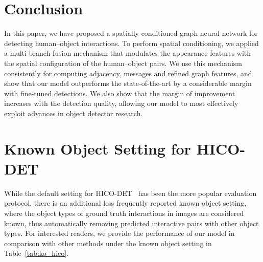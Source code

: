 \documentclass[10pt,twocolumn,letterpaper]{article}
\begin{document}
\section{Conclusion}

In this paper, we have proposed a spatially conditioned graph neural network for detecting human--object interactions. To perform spatial conditioning, we applied a multi-branch fusion mechanism that modulates the appearance features with the spatial configuration of the human--object pairs. We use this mechanism consistently for computing adjacency, messages and refined graph features, and show that our model outperforms the state-of-the-art by a considerable margin with fine-tuned detections.
We also show that the margin of improvement increases with the detection quality, allowing our model to most effectively exploit advances in object detector research.


{\small


}

\appendix

\section{Known Object Setting for HICO-DET}

While the default setting for HICO-DET~\cite{chao2018} has been the more popular evaluation protocol, there is an additional less frequently reported known object setting, where the object types of ground truth interactions in images are considered known, thus automatically removing predicted interactive pairs with other object types. For interested readers, we provide the performance of our model in comparison with other methods under the known object setting in Table~\ref{tab:ko_hico}.
\end{document}
